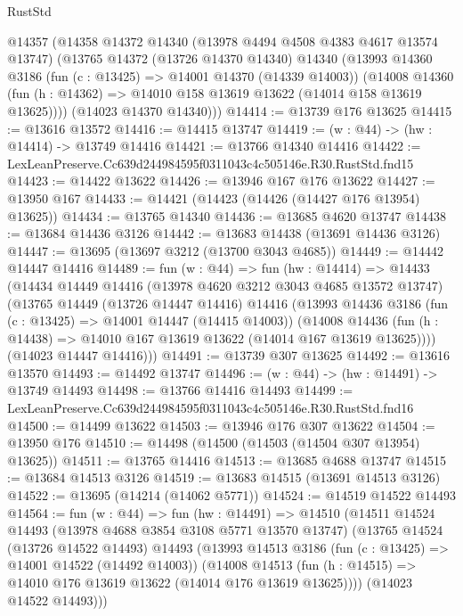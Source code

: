 \begin{lexlean}{RustStd}
\begin{coremodule}
  @14357
    (@14358
      @14372
      @14340
      (@13978 @4494 @4508 @4383 @4617 @13574 @13747)
      (@13765
        @14372
        (@13726 @14370 @14340)
        @14340
        (@13993
          @14360
          @3186
          (fun (c : @13425) => @14001 @14370 (@14339 @14003))
          (@14008
            @14360
            (fun (h : @14362) => @14010 @158 @13619 @13622 (@14014 @158 @13619 @13625))))
        (@14023 @14370 @14340)))
@14414 := @13739 @176 @13625
@14415 := @13616 @13572
@14416 := @14415 @13747
@14419 := (w : @44) -> (hw : @14414) -> @13749 @14416
@14421 := @13766 @14340 @14416
@14422 := LexLeanPreserve.Cc639d244984595f0311043c4c505146e.R30.RustStd.fnd15
@14423 := @14422 @13622
@14426 := @13946 @167 @176 @13622
@14427 := @13950 @167
@14433 := @14421 (@14423 (@14426 (@14427 @176 @13954) @13625))
@14434 := @13765 @14340
@14436 := @13685 @4620 @13747
@14438 := @13684 @14436 @3126
@14442 := @13683 @14438 (@13691 @14436 @3126)
@14447 := @13695 (@13697 @3212 (@13700 @3043 @4685))
@14449 := @14442 @14447 @14416
@14489 := fun (w : @44) =>
  fun (hw : @14414) =>
  @14433
    (@14434
      @14449
      @14416
      (@13978 @4620 @3212 @3043 @4685 @13572 @13747)
      (@13765
        @14449
        (@13726 @14447 @14416)
        @14416
        (@13993
          @14436
          @3186
          (fun (c : @13425) => @14001 @14447 (@14415 @14003))
          (@14008
            @14436
            (fun (h : @14438) => @14010 @167 @13619 @13622 (@14014 @167 @13619 @13625))))
        (@14023 @14447 @14416)))
@14491 := @13739 @307 @13625
@14492 := @13616 @13570
@14493 := @14492 @13747
@14496 := (w : @44) -> (hw : @14491) -> @13749 @14493
@14498 := @13766 @14416 @14493
@14499 := LexLeanPreserve.Cc639d244984595f0311043c4c505146e.R30.RustStd.fnd16
@14500 := @14499 @13622
@14503 := @13946 @176 @307 @13622
@14504 := @13950 @176
@14510 := @14498 (@14500 (@14503 (@14504 @307 @13954) @13625))
@14511 := @13765 @14416
@14513 := @13685 @4688 @13747
@14515 := @13684 @14513 @3126
@14519 := @13683 @14515 (@13691 @14513 @3126)
@14522 := @13695 (@14214 (@14062 @5771))
@14524 := @14519 @14522 @14493
@14564 := fun (w : @44) =>
  fun (hw : @14491) =>
  @14510
    (@14511
      @14524
      @14493
      (@13978 @4688 @3854 @3108 @5771 @13570 @13747)
      (@13765
        @14524
        (@13726 @14522 @14493)
        @14493
        (@13993
          @14513
          @3186
          (fun (c : @13425) => @14001 @14522 (@14492 @14003))
          (@14008
            @14513
            (fun (h : @14515) => @14010 @176 @13619 @13622 (@14014 @176 @13619 @13625))))
        (@14023 @14522 @14493)))

\end{coremodule}
\end{lexlean}
